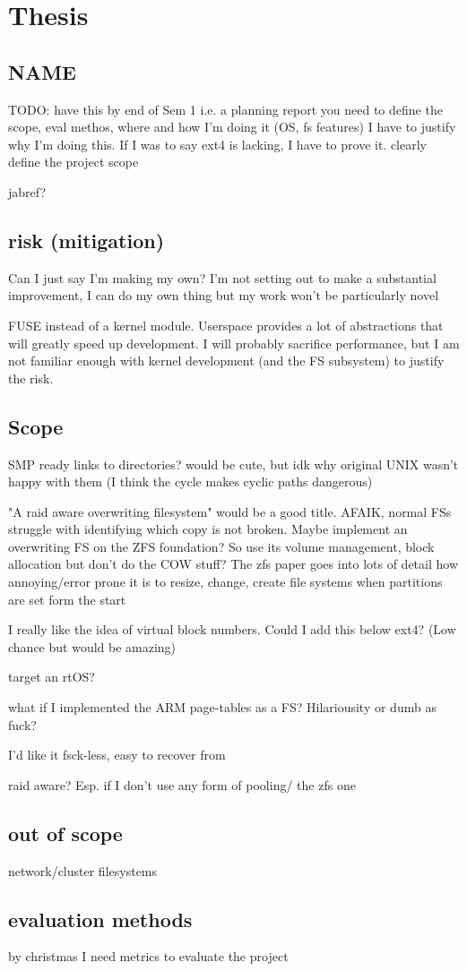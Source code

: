 \documentclass[a4paper]{article}
\begin{document}
\chapter{Thesis}
    \section{NAME}
    TODO: have this by end of Sem 1
    i.e. a planning report
    you need to define the scope, eval methos, where and how I'm doing it (OS, fs features)
    I have to justify why I'm doing this. If I was to say ext4 is lacking, I have to prove it.
    clearly define the project scope

    jabref?

    \section{risk (mitigation)}
        Can I just say I'm making my own? I'm not setting out to make a
        substantial improvement, I can do my own thing but my work won't be
        particularly novel

        FUSE instead of a kernel module. Userspace provides a lot of
        abstractions that will greatly speed up development. I will probably
        sacrifice performance, but I am not familiar enough with kernel
        development (and the FS subsystem) to justify the risk.

    \section{Scope}
        SMP ready
        links to directories? would be cute, but idk why original UNIX wasn't
        happy with them (I think the cycle makes cyclic paths dangerous)

        "A raid aware overwriting filesystem" would be a good title. AFAIK,
        normal FSs struggle with identifying which copy is not broken. Maybe
        implement an overwriting FS on the ZFS foundation? So use its volume
        management, block allocation but don't do the COW stuff? The zfs paper
        goes into lots of detail how annoying/error prone it is to resize,
        change, create file systems when partitions are set form the start

        I really like the idea of virtual block numbers. Could I add this below
        ext4? (Low chance but would be amazing)

        target an rtOS?

        what if I implemented the ARM page-tables as a FS? Hilariousity or dumb as fuck?

        I'd like it fsck-less, easy to recover from

        raid aware? Esp. if I don't use any form of pooling/ the zfs one

    \section{out of scope}
        network/cluster filesystems

    \section{evaluation methods}
        by christmas I need metrics to evaluate the project
\end{document}
